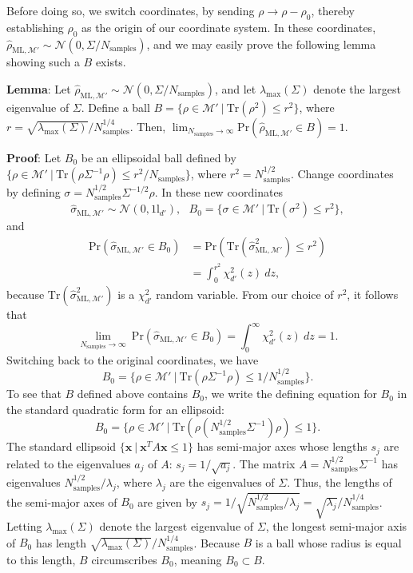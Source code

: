 \documentclass[aps,pra, twocolumn]{revtex4-1}
\newcommand{\M}{\mathcal{M}}
\newcommand{\Id}{\mathbb{I}}
\def\Id{1\!\mathrm{l}}
\newcommand{\rhohat}{\hat{\rho}}
\newcommand{\rhoML}[1]{\rhohat_{\scriptscriptstyle{\mathrm{ML},#1}}}
\begin{document}
Before doing so, we switch coordinates, by sending $\rho \rightarrow \rho - \rho_{0}$, thereby establishing $\rho_{0}$ as the origin of our coordinate system. In these coordinates, $\rhoML{\M'} \sim \mathcal{N}(0, \Sigma/N_{\mathrm{samples}})$, and we may easily prove the following lemma showing such a $B$ exists.

\textbf{Lemma}: Let $\rhoML{\M'} \sim \mathcal{N}(0, \Sigma/N_{\mathrm{samples}})$, and let $\lambda_{\max}(\Sigma)$ denote the largest eigenvalue of $\Sigma$. Define a ball $B = \{\rho \in \M' ~|~\mathrm{Tr}(\rho^{2}) \leq r^{2}\}$, where $r = \sqrt{\lambda_{\max}(\Sigma)}/N_{\mathrm{samples}}^{1/4}$. Then, $\lim_{N_{\mathrm{samples}} \rightarrow \infty} \mathrm{Pr}(\rhoML{\M'} \in B) =1$.

\textbf{Proof}: Let $B_{0}$ be an ellipsoidal ball defined by $\{\rho \in \M'~|~\mathrm{Tr}(\rho \Sigma^{-1} \rho) \leq r^{2}/N_{\mathrm{samples}}\}$, where $r^{2} = N^{1/2}_{\mathrm{samples}}$. Change coordinates by defining $\sigma = N_{\mathrm{samples}}^{1/2}\Sigma^{-1/2}\rho$. In these new coordinates
\[\hat{\sigma}_{\mathrm{ML},\M'} \sim \mathcal{N}(0, \Id_{d'}),~~~B_{0} = \{\sigma \in \M'~|~\mathrm{Tr}(\sigma^{2}) \leq r^{2}\},\]
and
\begin{align*}
\mathrm{Pr}(\hat{\sigma}_{\mathrm{ML},\M'} \in B_{0}) &= \mathrm{Pr}(\mathrm{Tr}(\hat{\sigma}_{\mathrm{ML},\M'}^{2}) \leq r^{2})\\
&= \int_{0}^{r^{2}}\chi^{2}_{d'}(z)~dz,
\end{align*}
because $\mathrm{Tr}(\hat{\sigma}_{\mathrm{ML},\M'}^{2})$ is a $\chi^{2}_{d'}$ random variable. From our choice of $r^{2}$, it follows that
\[\lim_{N_{\mathrm{samples}} \rightarrow \infty}~\mathrm{Pr}(\hat{\sigma}_{\mathrm{ML},\M'} \in B_{0})  =\int_{0}^{\infty}\chi^{2}_{d'}(z)~dz =1.\]
Switching back to the original coordinates, we have
\[B_{0} = \{\rho \in \M'~|~\mathrm{Tr}(\rho \Sigma^{-1} \rho) \leq 1/N_{\mathrm{samples}}^{1/2}\}.\]
To see that $B$ defined above contains $B_{0}$, we write the defining equation for $B_{0}$ in the standard quadratic form for an ellipsoid:
\[B_{0} = \{\rho \in \M'~|~\mathrm{Tr}(\rho ( N_{\mathrm{samples}}^{1/2}\Sigma^{-1} ) \rho) \leq 1\}.\]
The standard ellipsoid $\{\mathbf{x}~|~\mathbf{x}^{T}A\mathbf{x} \leq 1\}$ has semi-major axes whose lengths $s_{j}$ are related to the eigenvalues $a_{j}$ of $A$: $s_{j} = 1/\sqrt{a_{j}}$. The matrix $A = N_{\mathrm{samples}}^{1/2}\Sigma^{-1}$ has eigenvalues $N_{\mathrm{samples}}^{1/2}/\lambda_{j}$, where $\lambda_{j}$ are the eigenvalues of $\Sigma$. Thus, the lengths of the semi-major axes of $B_{0}$ are given by $s_{j} = 1/\sqrt{N_{\mathrm{samples}}^{1/2}/\lambda_{j}} = \sqrt{\lambda_{j}}/N_{\mathrm{samples}}^{1/4}$. Letting $\lambda_{\max}(\Sigma)$ denote the largest eigenvalue of $\Sigma$, the longest semi-major axis of $B_{0}$ has length $\sqrt{\lambda_{\max}(\Sigma)}/N_{\mathrm{samples}}^{1/4}$.
Because $B$ is a ball whose radius is equal to this length, $B$ circumscribes $B_{0}$, meaning $B_{0} \subset B$.
\end{document}
